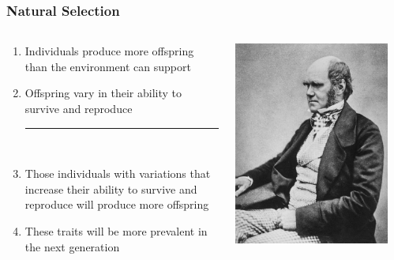\documentclass[10pt]{beamer}
\begin{document}
\begin{frame}[t]
\frametitle{Natural Selection}
\vspace{0.5cm}

	\begin{columns}
		\begin{column}{0.7\textwidth}
			\begin{enumerate}
				\item Individuals produce more offspring than the environment can support
				\medskip
				\item Offspring vary in their ability to survive and reproduce
				\begin{center}
					\rule{0.5\textwidth}{0.5pt}\\
				\end{center}
				\smallskip
				\item Those individuals with variations that increase their ability to survive and reproduce will produce more offspring
				\medskip
				\item These traits will be more prevalent in the next generation
			\end{enumerate}
		\end{column}
		
		\begin{column}{0.3\textwidth}
			\begin{center}
				\includegraphics[width=0.9\textwidth]{figures/Darwin.jpg}
			\end{center}
		\end{column}
	\end{columns}
\end{frame}
\end{document}
